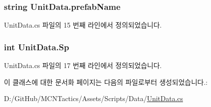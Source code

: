 \subsubsection[{\texorpdfstring{prefab\+Name}{prefabName}}]{\setlength{\rightskip}{0pt plus 5cm}string Unit\+Data.\+prefab\+Name}\hypertarget{class_unit_data_a1523fa01f295711683596fec6f3268e5}{}\label{class_unit_data_a1523fa01f295711683596fec6f3268e5}


Unit\+Data.\+cs 파일의 15 번째 라인에서 정의되었습니다.

\subsubsection[{\texorpdfstring{Sp}{Sp}}]{\setlength{\rightskip}{0pt plus 5cm}int Unit\+Data.\+Sp}\hypertarget{class_unit_data_afb0acf2fc188d92dfac3a7377794f72f}{}\label{class_unit_data_afb0acf2fc188d92dfac3a7377794f72f}


Unit\+Data.\+cs 파일의 17 번째 라인에서 정의되었습니다.



이 클래스에 대한 문서화 페이지는 다음의 파일로부터 생성되었습니다.\+:\begin{DoxyCompactItemize}
\item 
D\+:/\+Git\+Hub/\+M\+C\+N\+Tactics/\+Assets/\+Scripts/\+Data/\hyperlink{_unit_data_8cs}{Unit\+Data.\+cs}\end{DoxyCompactItemize}
